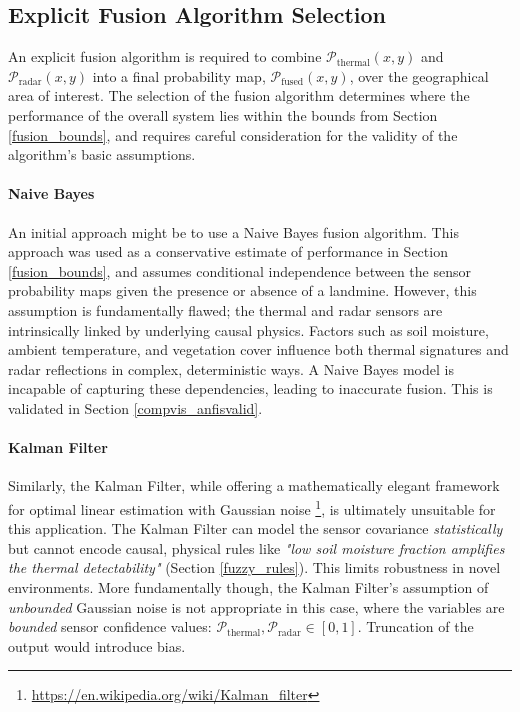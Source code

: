 \subsection{Explicit Fusion Algorithm Selection}

        An explicit fusion algorithm is required to combine \(\mathcal{P}_\text{thermal}(x, y)\) and \(\mathcal{P}_\text{radar}(x, y)\) into a final probability map, \(\mathcal{P}_\text{fused}(x, y)\), over the geographical area of interest. The selection of the fusion algorithm determines where the performance of the overall system lies within the bounds from Section \ref{fusion_bounds}, and requires careful consideration for the validity of the algorithm's basic assumptions.
    
    \paragraph{Naive Bayes}
    
        An initial approach might be to use a Naive Bayes fusion algorithm. This approach was used as a conservative estimate of performance in Section \ref{fusion_bounds}, and assumes conditional independence between the sensor probability maps given the presence or absence of a landmine. However, this assumption is fundamentally flawed; the thermal and radar sensors are intrinsically linked by underlying causal physics. Factors such as soil moisture, ambient temperature, and vegetation cover influence both thermal signatures and radar reflections in complex, deterministic ways. A Naive Bayes model is incapable of capturing these dependencies, leading to inaccurate fusion. This is validated in Section \ref{compvis_anfisvalid}.
    
    \paragraph{Kalman Filter}
    
        Similarly, the Kalman Filter, while offering a mathematically elegant framework for optimal linear estimation with Gaussian noise \footnote{\url{https://en.wikipedia.org/wiki/Kalman_filter}}, is ultimately unsuitable for this application. The Kalman Filter can model the sensor covariance \textit{statistically} but cannot encode causal, physical rules like \textit{"low soil moisture fraction amplifies the thermal detectability"} (Section \ref{fuzzy_rules}). This limits robustness in novel environments. More fundamentally though, the Kalman Filter's assumption of \textit{unbounded} Gaussian noise is not appropriate in this case, where the variables are \textit{bounded} sensor confidence values: \(\mathcal{P}_{\text{thermal}}, \mathcal{P}_{\text{radar}} \in [0,1]\). Truncation of the output would introduce bias.
    
